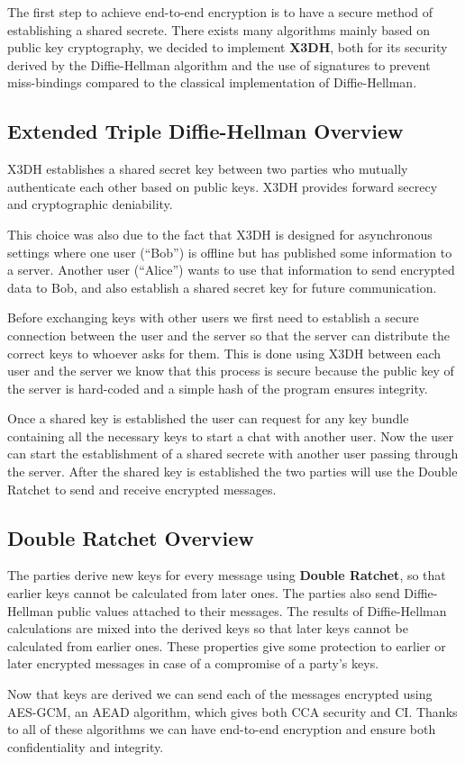 The first step to achieve end-to-end encryption is to have a secure method of establishing a shared secrete. There exists many algorithms mainly based on public key cryptography, we decided to implement \textbf{X3DH}, both for its security derived by the Diffie-Hellman algorithm and the use of signatures to prevent miss-bindings compared to the classical implementation of Diffie-Hellman.

\subsection {Extended Triple Diffie-Hellman Overview}
\label{subsec:ExtendedTripleDiffieHellman Overview}

X3DH establishes a shared secret key between two parties who mutually authenticate each other based on public keys. X3DH provides forward secrecy and cryptographic deniability.

This choice was also due to the fact that X3DH is designed for asynchronous settings where one user (“Bob”) is offline but has published some information to a server. Another user (“Alice”) wants to use that information to send encrypted data to Bob, and also establish a shared secret key for future communication.

Before exchanging keys with other users we first need to establish a secure connection between the user and the server so that the server can distribute the correct keys to whoever asks for them. This is done using X3DH between each user and the server we know that this process is secure because the public key of the server is hard-coded and a simple hash of the program ensures integrity.

Once a shared key is established the user can request for any key bundle containing all the necessary keys to start a chat with another user. Now the user can start the establishment of a shared secrete with another user passing through the server. After the shared key is established the two parties will use the Double Ratchet to send and receive encrypted messages.

\subsection{Double Ratchet Overview}
\label{subsec:DoubleRachetOverview}

The parties derive new keys for every message using \textbf{Double Ratchet}, so that earlier keys cannot be calculated from later ones. The parties also send Diffie-Hellman public values attached to their messages. The results of Diffie-Hellman calculations are mixed into the derived keys so that later keys cannot be calculated from earlier ones. These properties give some protection to earlier or later encrypted messages in case of a compromise of a party’s keys.

Now that keys are derived we can send each of the messages encrypted using AES-GCM, an AEAD algorithm, which gives both CCA security and CI. Thanks to all of these algorithms we can have end-to-end encryption and ensure both confidentiality and integrity.
